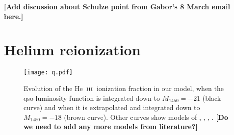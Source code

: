 \documentclass[a4paper,fleqn,usenatbib]{mnras}
\newcommand{\gk}[1]{{\bf \color{notecolor} [#1]}}
\def\HeIII{\hbox{He~$\scriptstyle\rm III$}}
\def\HeIII{\hbox{He~$\scriptstyle\rm III$}}
\begin{document}
\gk{Add discussion about Schulze point from Gabor's 8 March email
  here.}

\section{Helium reionization}

\begin{figure}
  \begin{center}
    \texttt{[image: q.pdf]}
  \end{center}
  \caption{Evolution of the \HeIII\ ionization fraction in our model,
    when the qso luminosity function is integrated down to
    $M_{1450}=-21$ (black curve) and when it is extrapolated and
    integrated down to $M_{1450}=-18$ (brown curve).  Other curves
    show models of \citet[solid grey]{2012ApJ...746..125H},
    \citet[dashed grey]{2015ApJ...813L...8M}, \citet[light blue and
      shaded region]{2016ApJ...828...90L},
    \citet[blue]{2018arXiv180104931P}. \gk{Do we need to add any more
      models from literature?}}
\end{figure}
\end{document}

